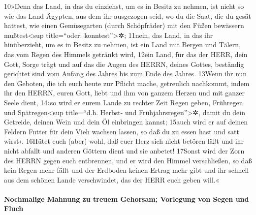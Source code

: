 10»Denn das Land, in das du einziehst, um es in Besitz zu nehmen, ist
nicht so wie das Land Ägypten, aus dem ihr ausgezogen seid, wo du die
Saat, die du gesät hattest, wie einen Gemüsegarten (durch Schöpfräder)
mit den Füßen bewässern mußtest\textless sup title=``oder:
konntest''\textgreater✲; 11nein, das Land, in das ihr hinüberzieht, um
es in Besitz zu nehmen, ist ein Land mit Bergen und Tälern, das vom
Regen des Himmels getränkt wird, 12ein Land, für das der HERR, dein
Gott, Sorge trägt und auf das die Augen des HERRN, deines Gottes,
beständig gerichtet sind vom Anfang des Jahres bis zum Ende des Jahres.
13Wenn ihr nun den Geboten, die ich euch heute zur Pflicht mache,
getreulich nachkommt, indem ihr den HERRN, euren Gott, liebt und ihm von
ganzem Herzen und mit ganzer Seele dient, 14›so wird er eurem Lande zu
rechter Zeit Regen geben, Frühregen und Spätregen\textless sup
title=``d.h. Herbst- und Frühjahrsregen''\textgreater✲, damit du dein
Getreide, deinen Wein und dein Öl einbringen kannst; 15auch wird er auf
deinen Feldern Futter für dein Vieh wachsen lassen, so daß du zu essen
hast und satt wirst‹. 16Hütet euch (aber) wohl, daß euer Herz sich nicht
betören läßt und ihr nicht abfallt und anderen Göttern dient und sie
anbetet! 17Sonst wird der Zorn des HERRN gegen euch entbrennen, und er
wird den Himmel verschließen, so daß kein Regen mehr fällt und der
Erdboden keinen Ertrag mehr gibt und ihr schnell aus dem schönen Lande
verschwindet, das der HERR euch geben will.«

\hypertarget{nochmalige-mahnung-zu-treuem-gehorsam-vorlegung-von-segen-und-fluch}{%
\paragraph{Nochmalige Mahnung zu treuem Gehorsam; Vorlegung von Segen
und
Fluch}\label{nochmalige-mahnung-zu-treuem-gehorsam-vorlegung-von-segen-und-fluch}}

